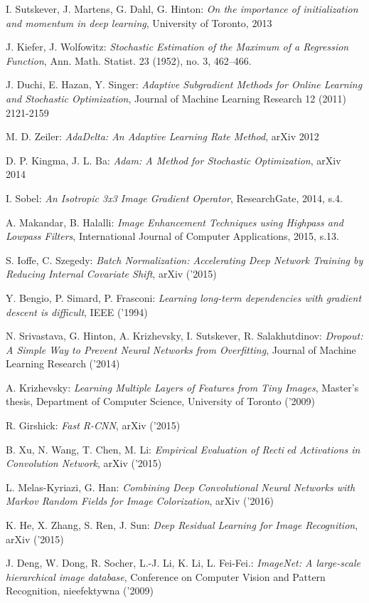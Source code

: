 \begin{thebibliography}{99}
   I. Sutskever, J. Martens, G. Dahl, G. Hinton:
  \emph{On the importance of initialization and momentum in deep learning},
  University of Toronto, 2013

   J. Kiefer, J. Wolfowitz:
  \emph{Stochastic Estimation of the Maximum of a Regression Function},
  Ann. Math. Statist. 23 (1952), no. 3, 462--466.

   J. Duchi, E. Hazan, Y. Singer:
  \emph{Adaptive Subgradient Methods for Online Learning and Stochastic Optimization},
  Journal of Machine Learning Research 12 (2011) 2121-2159

   M. D. Zeiler:
  \emph{AdaDelta: An Adaptive Learning Rate Method},
  arXiv 2012

   D. P. Kingma, J. L. Ba:
  \emph{Adam: A Method for Stochastic Optimization},
  arXiv 2014

   I. Sobel:
  \emph{An Isotropic 3x3 Image Gradient Operator},
  ResearchGate, 2014, s.4.

   A. Makandar, B. Halalli:
  \emph{Image Enhancement Techniques using Highpass and Lowpass Filters},
  International Journal of Computer Applications, 2015, s.13.

   S. Ioffe, C. Szegedy:
  \emph{Batch Normalization: Accelerating Deep Network Training by Reducing
  Internal Covariate Shift}, arXiv ('2015)

   Y. Bengio, P. Simard, P. Frasconi:
  \emph{Learning long-term dependencies with gradient descent is difficult},
  IEEE ('1994)

   N. Srivastava, G. Hinton, A. Krizhevsky,
  I. Sutskever, R. Salakhutdinov:
  \emph{Dropout: A Simple Way to Prevent Neural Networks from Overfitting},
  Journal of Machine Learning Research ('2014)

   A. Krizhevsky:
  \emph{Learning Multiple Layers of Features from Tiny Images},
  Master’s thesis, Department of Computer Science, University of Toronto ('2009)

   R. Girshick:
  \emph{Fast R-CNN},
  arXiv ('2015)

   B. Xu, N. Wang, T. Chen, M. Li:
  \emph{Empirical Evaluation of Rectied Activations in Convolution Network},
   arXiv ('2015)

   L. Melas-Kyriazi, G. Han:
  \emph{Combining Deep Convolutional Neural Networks with Markov Random
  Fields for Image Colorization}, arXiv ('2016)

   K. He, X. Zhang, S. Ren, J. Sun:
  \emph{Deep Residual Learning for Image Recognition}, arXiv ('2015)

  J. Deng, W. Dong, R. Socher, L.-J. Li, K. Li, L. Fei-Fei.:
  \emph{ImageNet: A large-scale hierarchical image database}, Conference on Computer Vision and Pattern Recognition, nieefektywna ('2009)

\end{thebibliography}
